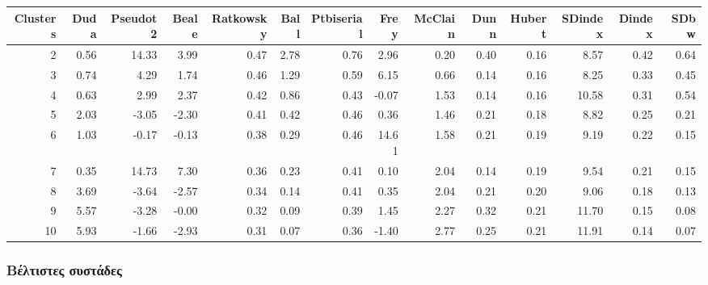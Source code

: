 \documentclass[a4paper,twoside,10pt]{article}
\begin{document}
\begin{table}[ht]
	\centering
	\tabcolsep=0.11cm
	\begin{tabular}{|r|rrrr|rrrrr|rrrr|}
		\hline
		Clusters& Duda & Pseudot2 & Beale & Ratkowsky & Ball & Ptbiserial & Frey & McClain & Dunn & Hubert & SDindex & Dindex & SDbw \\
		\hline
		2 & 0.56 & 14.33 & 3.99 & 0.47 & 2.78 & 0.76 & 2.96 & 0.20 & 0.40 & 0.16 & 8.57 & 0.42 & 0.64 \\ 
		\rowcolor[rgb]{0.9,0.9,0.9} 3 & 0.74 & 4.29 & 1.74 & 0.46 & 1.29 & 0.59 & 6.15 & 0.66 & 0.14 & 0.16 & 8.25 & 0.33 & 0.45 \\
		4 & 0.63 & 2.99 & 2.37 & 0.42 & 0.86 & 0.43 & -0.07 & 1.53 & 0.14 & 0.16 & 10.58 & 0.31 & 0.54 \\
		5 & 2.03 & -3.05 & -2.30 & 0.41 & 0.42 & 0.46 & 0.36 & 1.46 & 0.21 & 0.18 & 8.82 & 0.25 & 0.21 \\ 
		6 & 1.03 & -0.17 & -0.13 & 0.38 & 0.29 & 0.46 & 14.61 & 1.58 & 0.21 & 0.19 & 9.19 & 0.22 & 0.15 \\
		7 & 0.35 & 14.73 & 7.30 & 0.36 & 0.23 & 0.41 & 0.10 & 2.04 & 0.14 & 0.19 & 9.54 & 0.21 & 0.15 \\
		8 & 3.69 & -3.64 & -2.57 & 0.34 & 0.14 & 0.41 & 0.35 & 2.04 & 0.21 & 0.20 & 9.06 & 0.18 & 0.13 \\
		9 & 5.57 & -3.28 & -0.00 & 0.32 & 0.09 & 0.39 & 1.45 & 2.27 & 0.32 & 0.21 & 11.70 & 0.15 & 0.08 \\ 
		10 & 5.93 & -1.66 & -2.93 & 0.31 & 0.07 & 0.36 & -1.40 & 2.77 & 0.25 & 0.21 & 11.91 & 0.14 & 0.07 \\
		\hline
	\end{tabular}
\end{table}

\subsubsection{Βέλτιστες συστάδες}
\end{document}
